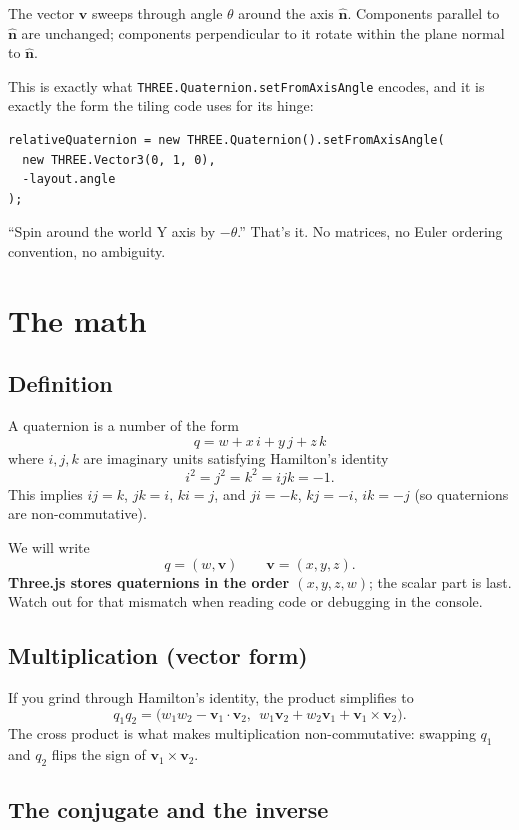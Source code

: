 \documentclass{article}
\begin{document}
The vector $\mathbf{v}$ sweeps through angle $\theta$ around the axis
$\hat{\mathbf{n}}$. Components parallel to $\hat{\mathbf{n}}$ are
unchanged; components perpendicular to it rotate within the plane normal
to $\hat{\mathbf{n}}$.

This is exactly what \texttt{THREE.Quaternion.setFromAxisAngle} encodes,
and it is exactly the form the tiling code uses for its hinge:

\begin{lstlisting}
relativeQuaternion = new THREE.Quaternion().setFromAxisAngle(
  new THREE.Vector3(0, 1, 0),
  -layout.angle
);
\end{lstlisting}

``Spin around the world Y axis by $-\theta$.'' That's it. No matrices, no
Euler ordering convention, no ambiguity.

\section{The math}

\subsection{Definition}

A quaternion is a number of the form
\[
  q = w + x\,i + y\,j + z\,k
\]
where $i, j, k$ are imaginary units satisfying Hamilton's identity
\[
  i^2 = j^2 = k^2 = ijk = -1.
\]
This implies $ij = k$, $jk = i$, $ki = j$, and $ji = -k$, $kj = -i$,
$ik = -j$ (so quaternions are non-commutative).

We will write
\[
  q = (w, \mathbf{v}) \qquad \mathbf{v} = (x, y, z).
\]
\textbf{Three.js stores quaternions in the order $(x, y, z, w)$}; the
scalar part is last. Watch out for that mismatch when reading code or
debugging in the console.

\subsection{Multiplication (vector form)}

If you grind through Hamilton's identity, the product simplifies to
\[
  q_1 q_2 = \bigl(w_1 w_2 - \mathbf{v}_1 \cdot \mathbf{v}_2,\ \
              w_1 \mathbf{v}_2 + w_2 \mathbf{v}_1 + \mathbf{v}_1 \times \mathbf{v}_2\bigr).
\]
The cross product is what makes multiplication non-commutative: swapping
$q_1$ and $q_2$ flips the sign of $\mathbf{v}_1 \times \mathbf{v}_2$.

\subsection{The conjugate and the inverse}
\end{document}
